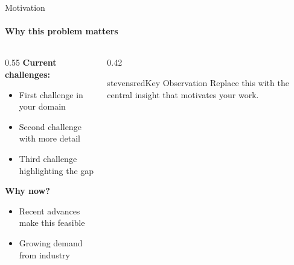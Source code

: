 
\begin{frame}{Motivation}
\framesubtitle{Why this problem matters}

\begin{columns}
\begin{column}{0.55\textwidth}
\textbf{Current challenges:}
\begin{itemize}
    \item First challenge in your domain
    \item Second challenge with more detail
    \item Third challenge highlighting the gap
\end{itemize}

\vspace{0.5em}
\textbf{Why now?}
\begin{itemize}
    \item Recent advances make this feasible
    \item Growing demand from industry
\end{itemize}
\end{column}
\begin{column}{0.42\textwidth}

\begin{colorblock}[white]{stevensred}{Key Observation}
Replace this with the central insight that motivates your work.
\end{colorblock}

\end{column}
\end{columns}
\end{frame}

